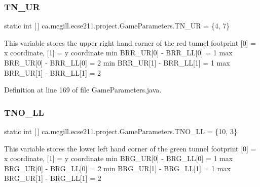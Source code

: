 \subsubsection{\texorpdfstring{T\+N\+\_\+\+UR}{TN\_UR}}
{\footnotesize\ttfamily  static  int \mbox{[}$\,$\mbox{]} ca.\+mcgill.\+ecse211.\+project.\+Game\+Parameters.\+T\+N\+\_\+\+UR = \{4, 7\}\hspace{0.3cm}{\ttfamily [static]}}

This variable stores the upper right hand corner of the red tunnel footprint \mbox{[}0\mbox{]} = x coordinate, \mbox{[}1\mbox{]} = y coordinate min B\+R\+R\+\_\+\+UR\mbox{[}0\mbox{]} -\/ B\+R\+R\+\_\+\+LL\mbox{[}0\mbox{]} = 1 max B\+R\+R\+\_\+\+UR\mbox{[}0\mbox{]} -\/ B\+R\+R\+\_\+\+LL\mbox{[}0\mbox{]} = 2 min B\+R\+R\+\_\+\+UR\mbox{[}1\mbox{]} -\/ B\+R\+R\+\_\+\+LL\mbox{[}1\mbox{]} = 1 max B\+R\+R\+\_\+\+UR\mbox{[}1\mbox{]} -\/ B\+R\+R\+\_\+\+LL\mbox{[}1\mbox{]} = 2 

Definition at line 169 of file Game\+Parameters.\+java.

\mbox{\label{enumca_1_1mcgill_1_1ecse211_1_1project_1_1_game_parameters_a951a1759354ae42a5030e36100f553bc}} 
\subsubsection{\texorpdfstring{T\+N\+O\+\_\+\+LL}{TNO\_LL}}
{\footnotesize\ttfamily  static  int \mbox{[}$\,$\mbox{]} ca.\+mcgill.\+ecse211.\+project.\+Game\+Parameters.\+T\+N\+O\+\_\+\+LL = \{10, 3\}\hspace{0.3cm}{\ttfamily [static]}}

This variable stores the lower left hand corner of the green tunnel footprint \mbox{[}0\mbox{]} = x coordinate, \mbox{[}1\mbox{]} = y coordinate min B\+R\+G\+\_\+\+UR\mbox{[}0\mbox{]} -\/ B\+R\+G\+\_\+\+LL\mbox{[}0\mbox{]} = 1 max B\+R\+G\+\_\+\+UR\mbox{[}0\mbox{]} -\/ B\+R\+G\+\_\+\+LL\mbox{[}0\mbox{]} = 2 min B\+R\+G\+\_\+\+UR\mbox{[}1\mbox{]} -\/ B\+R\+G\+\_\+\+LL\mbox{[}1\mbox{]} = 1 max B\+R\+G\+\_\+\+UR\mbox{[}1\mbox{]} -\/ B\+R\+G\+\_\+\+LL\mbox{[}1\mbox{]} = 2 

